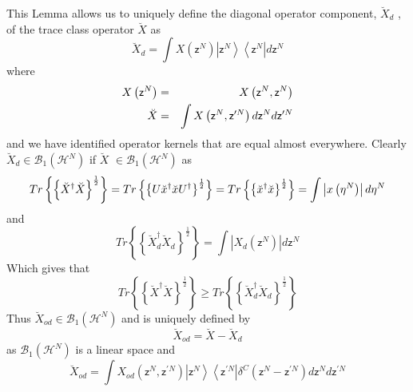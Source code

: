 \documentclass[aps,preprint]{revtex4}
\begin{document}
This Lemma allows us to uniquely define the diagonal operator component, $%
\breve{X}_{d}$ , of the trace class operator $\breve{X}$ as 
\begin{equation}
\breve{X}_{d}=\int X\left( \mathsf{z}^{N}\right) \left\vert \mathsf{z}%
^{N}\right\rangle \left\langle \mathsf{z}^{N}\right\vert d\mathsf{z}^{N}
\end{equation}%
where 
\begin{eqnarray}
X\left( \mathsf{z}^{N}\right) &=&X\left( \mathsf{z}^{N},\mathsf{z}^{N}\right)
\notag \\
\breve{X} &=&\int X\left( \mathsf{z}^{N},\mathsf{z}^{\prime N}\right) d%
\mathsf{z}^{N}d\mathsf{z}^{\prime N}
\end{eqnarray}%
and we have identified operator kernels that are equal almost everywhere.
Clearly $\breve{X}_{d}\in \mathcal{B}_{1}\left( \mathcal{H}^{N}\right) $ if $%
\breve{X}$ $\in \mathcal{B}_{1}\left( \mathcal{H}^{N}\right) $ as 
\begin{equation}
Tr\left\{ \left\{ \breve{X}^{\dagger }\breve{X}\right\} ^{\frac{1}{2}%
}\right\} =Tr\left\{ \left\{ U\breve{x}^{\dagger }\breve{x}U^{\dagger
}\right\} ^{\frac{1}{2}}\right\} =Tr\left\{ \left\{ \breve{x}^{\dagger }%
\breve{x}\right\} ^{\frac{1}{2}}\right\} =\int \left\vert x\left( \mathsf{%
\eta }^{N}\right) \right\vert d\mathsf{\eta }^{N}
\end{equation}%
and 
\begin{equation}
Tr\left\{ \left\{ \breve{X}_{d}^{\dagger }\breve{X}_{d}\right\} ^{\frac{1}{2}%
}\right\} =\int \left\vert X_{d}\left( \mathsf{z}^{N}\right) \right\vert d%
\mathsf{z}^{N}
\end{equation}%
Which gives that 
\begin{equation}
Tr\left\{ \left\{ \breve{X}^{\dagger }\breve{X}\right\} ^{\frac{1}{2}%
}\right\} \geq Tr\left\{ \left\{ \breve{X}_{d}^{\dagger }\breve{X}%
_{d}\right\} ^{\frac{1}{2}}\right\}
\end{equation}%
Thus $\breve{X}_{od}\in \mathcal{B}_{1}\left( \mathcal{H}^{N}\right) $ and
is uniquely defined by 
\begin{equation}
\breve{X}_{od}=\breve{X}-\breve{X}_{d}
\end{equation}%
as $\mathcal{B}_{1}\left( \mathcal{H}^{N}\right) $ is a linear space and 
\begin{equation}
\breve{X}_{od}=\int X_{od}\left( \mathsf{z}^{N},\mathsf{z}^{\prime N}\right)
\left\vert \mathsf{z}^{N}\right\rangle \left\langle \mathsf{z}^{\prime
N}\right\vert \delta ^{C}\left( \mathsf{z}^{N}-\mathsf{z}^{\prime N}\right) d%
\mathsf{z}^{N}d\mathsf{z}^{\prime N}
\end{equation}
\end{document}
